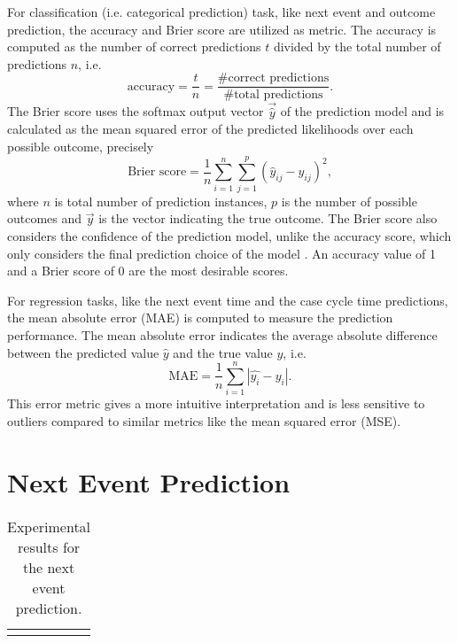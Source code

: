 For classification (i.e. categorical prediction) task, like next event and outcome prediction, the accuracy and Brier score \cite{Brier1950VERIFICATIONOF} are utilized as metric.
The accuracy is computed as the number of correct predictions $t$ divided by the total number of predictions $n$, i.e. 
\begin{equation*}
	\textrm{accuracy} = \dfrac{t}{n} = \dfrac{\textrm{\# correct predictions}}{\textrm{\# total predictions}}.
\end{equation*}
The Brier score uses the softmax output vector  $\vec{\hat{y}}$ of the prediction model and is calculated as the mean squared error of the predicted likelihoods over each possible outcome, precisely
\begin{equation*}
	\textrm{Brier score} = \dfrac{1}{n} \sum_{i=1}^{n}\sum_{j=1}^{p}(\hat{y}_{ij}-y_{ij})^2,
\end{equation*}
where $n$ is total number of prediction instances, $p$ is the number of possible outcomes and $\vec{y}$ is the vector indicating the true outcome.
The Brier score also considers the confidence of the prediction model, unlike the accuracy score, which only considers the final prediction choice of the model .
An accuracy value of 1 and a Brier score of 0 are the most desirable scores.

For regression tasks, like the next event time and the case cycle time predictions, the mean absolute error (MAE) is computed to measure the prediction performance. The mean absolute error indicates the average absolute difference between the predicted value $\hat{y}$ and the true value $y$,  i.e.
\begin{equation*}
	\textrm{MAE} = \dfrac{1}{n}\sum_{i=1}^{n}|\hat{y_i} - y_i|.
\end{equation*}
This error metric gives a more intuitive interpretation and is less sensitive to outliers compared to similar metrics like the mean squared error (MSE).





\section{Next Event Prediction}

\begin{table}[!htbp]
	\begin{tabularx}{\textwidth}{l l l l }
		\toprule
		& & &  \\
		\midrule
		& & & \\
		\bottomrule
	\end{tabularx}
	\caption[Experimental results for the next event prediction]{Experimental results for the next event prediction.}
	\label{tab:next-event}
\end{table}

